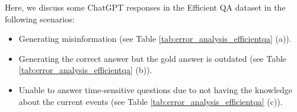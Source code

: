 \documentclass[11pt]{article}
\begin{document}
\begin{table*}
{\begin{tabular}{p{\linewidth}p{\linewidth}p{\linewidth}}
\bottomrule

\end{tabular}}
\caption{Some examples of ChatGPT responses in the EfficientQA dataset: (a) generating wrong answer, (b) generating correct answer but the gold answer in the dataset is outdated, (c) being unable to generate an answer due to not having the information about time-sensitive questions.}
\label{tab:error_analysis_efficientqa}
\end{table*} 
Here, we discuss some ChatGPT responses in the Efficient QA dataset in the following scenarios: 
\begin{itemize}
    \item Generating misinformation (see Table \ref{tab:error_analysis_efficientqa} (a)).
    \item Generating the correct answer but the gold answer is outdated (see Table \ref{tab:error_analysis_efficientqa} (b)).
    \item  Unable to answer time-sensitive questions due to not having the knowledge about the current events (see Table \ref{tab:error_analysis_efficientqa} (c)). 
\end{itemize}
\end{document}
